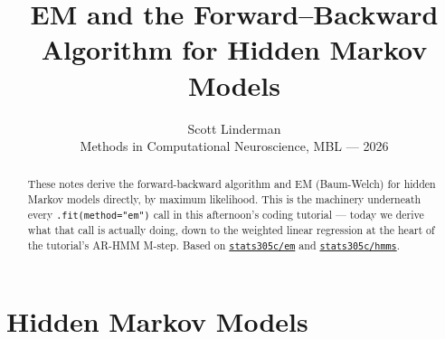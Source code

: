 \documentclass[11pt]{article}
\title{EM and the Forward--Backward Algorithm for Hidden Markov Models}
\author{Scott Linderman \\ \small Methods in Computational Neuroscience, MBL --- 2026}
\date{}
\begin{document}
\maketitle

\begin{abstract}
\noindent
These notes derive the forward-backward algorithm and EM (Baum-Welch)
\citep{baum1970maximization} for hidden Markov models directly, by
maximum likelihood. This is the machinery
underneath every \texttt{.fit(method="em")} call in this afternoon's coding
tutorial --- today we derive what that call is actually doing, down to the
weighted linear regression at the heart of the tutorial's AR-HMM M-step.
Based on
\href{https://slinderman.github.io/stats305c/em/}{\texttt{stats305c/em}} and
\href{https://slinderman.github.io/stats305c/hmms/}{\texttt{stats305c/hmms}}.
\end{abstract}

\tableofcontents

\section{Hidden Markov Models}
\end{document}

